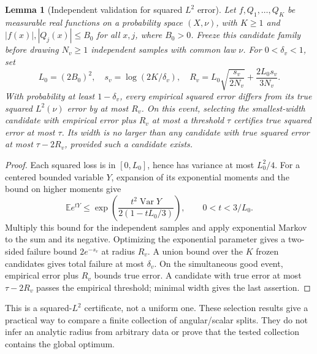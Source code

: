 \documentclass[11pt,letterpaper]{article}
\newtheorem{lemma}{Lemma}[section]
\theoremstyle{definition}
\theoremstyle{remark}
\begin{document}
\begin{lemma}[Independent validation for squared \(L^2\) error]\label{thm:validation}
Let \(f,Q_1,\ldots,Q_K\) be measurable real functions on a probability space
\((X,\nu)\), with \(K\ge1\) and
\(|f(x)|,|Q_j(x)|\le B_0\) for all \(x,j\), where \(B_0>0\).
Freeze this candidate family before drawing \(N_v\ge1\) independent samples
with common law \(\nu\).
For \(0<\delta_v<1\), set
\[
 L_0=(2B_0)^2,\quad s_v=\log(2K/\delta_v),\quad
 R_v=L_0\sqrt{\frac{s_v}{2N_v}}+\frac{2L_0s_v}{3N_v}.
\]
With probability at least \(1-\delta_v\), every empirical squared error
differs from its true squared \(L^2(\nu)\) error by at most \(R_v\).
On this event, selecting the smallest-width candidate with empirical error
plus \(R_v\) at most a threshold \(\tau\) certifies true squared error at most
\(\tau\). Its width is no larger than any candidate with true squared error
at most \(\tau-2R_v\), provided such a candidate exists.
\end{lemma}
\begin{proof}
Each squared loss is in \([0,L_0]\), hence has variance at most \(L_0^2/4\).
For a centered bounded variable \(Y\), expansion of its exponential moments
and the bound on higher moments give
\[
 \mathbb E e^{tY}
 \le\exp\!\left(\frac{t^2\operatorname{Var}Y}{2(1-tL_0/3)}\right),
 \qquad 0<t<3/L_0.
\]
Multiply this bound for the independent samples and apply exponential Markov
to the sum and its negative. Optimizing the exponential parameter gives a
two-sided failure bound \(2e^{-s_v}\) at radius \(R_v\).
A union bound over the \(K\) frozen candidates gives total failure at most
\(\delta_v\).
On the simultaneous good event, empirical error plus \(R_v\) bounds true
error. A candidate with true error at most \(\tau-2R_v\) passes the empirical
threshold; minimal width gives the last assertion.
\end{proof}
This is a squared-\(L^2\) certificate, not a uniform one.
These selection results give a practical way to compare a finite collection
of angular/scalar splits. They do not infer an analytic radius from arbitrary
data or prove that the tested collection contains the global optimum.
\end{document}
